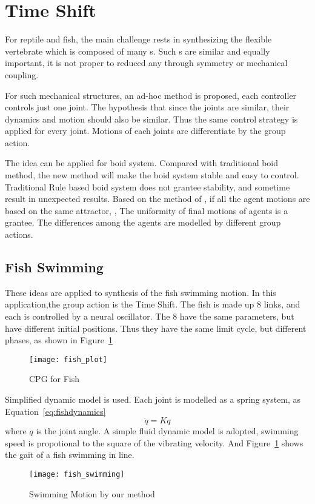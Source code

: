 {\section{Time Shift}

For reptile and fish, the main challenge rests in synthesizing the flexible vertebrate which is composed of many {\dof}s.
Such {\dof}s are similar and equally important, it is not proper to reduced any \dof through symmetry or mechanical coupling.

For such mechanical structures, an ad-hoc method is proposed, each controller controls just one joint.
The hypothesis that since the joints are similar, their dynamics and motion should also be similar.
Thus the same control strategy is applied for every joint.
Motions of each joints are differentiate by the group action.


The idea can be applied for boid system\citep{reynolds1987flocks}.
Compared with traditional boid method, the new method will make the boid system stable and easy to control.
Traditional Rule based boid system does not grantee stability, and sometime result in unexpected results.
Based on the method of \moit, if all the agent motions are based on the same attractor, ,
The uniformity of final motions of agents is a grantee.
The differences  among the agents are modelled by different group actions.

\subsection*{Fish Swimming}
These ideas are applied to synthesis of the fish swimming motion.
In this application,the group action is the Time Shift.
The fish is made up 8 links, and each {\dof} is controlled by a neural oscillator.
The $8$ \cpg have the same parameters, but have different initial positions. 
Thus they have the same limit cycle, but different phases, as shown in Figure~\ref{fig:fishplot}



\begin{figure}[!htbp]
  \begin{center}
      \texttt{[image: fish\_plot]}
    \caption{CPG for Fish}
    \label{fig:fishplot}
\end{center}
\end{figure}




Simplified dynamic model is used.
Each joint is modelled as a spring system, as Equation~\ref{eq:fishdynamics}
\begin{equation}
\label{eq:fishdynamics}
\ddot{q}=Kq
\end{equation}
where $q$ is the joint angle.
A simple fluid dynamic model is adopted,  swimming speed is propotional to the square of the vibrating velocity.
And Figure~\ref{} shows the gait of a fish swimming in line.
\begin{figure}[!htbp]
  \begin{center}
      \texttt{[image: fish\_swimming]}
    \caption{Swimming Motion by our method}
    \label{fig:fishswimming}
\end{center}
\end{figure}


}
